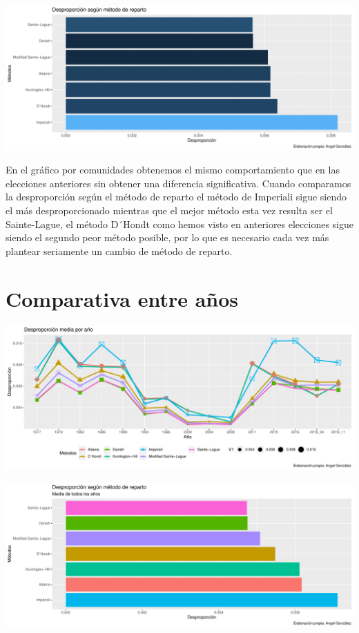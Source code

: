 \documentclass[12pt,a4paper,]{book}
\numberwithin{dummy}{section}
\theoremstyle{ocrenumbox}
\theoremstyle{blacknumex}
\theoremstyle{blacknumbox}
\theoremstyle{ocrenum}
\theoremstyle{ocrenum}
\begin{document}
\begin{center}\includegraphics[width=0.95\linewidth]{figurasR/unnamed-chunk-189-2} \end{center}

En el gráfico por comunidades obtenemos el mismo comportamiento que en
las elecciones anteriores sin obtener una diferencia significativa.
Cuando comparamos la desproporción según el método de reparto el método
de Imperiali sigue siendo el más desproporcionado mientras que el mejor
método esta vez resulta ser el Sainte-Lague, el método D´Hondt como
hemos visto en anteriores elecciones sigue siendo el segundo peor método
posible, por lo que es necesario cada vez más plantear seriamente un
cambio de método de reparto.

\hypertarget{comparativa-entre-auxf1os}{%
\section{Comparativa entre años}\label{comparativa-entre-auxf1os}}

\begin{center}\includegraphics[width=0.95\linewidth]{figurasR/unnamed-chunk-190-1} \end{center}

\begin{center}\includegraphics[width=0.95\linewidth]{figurasR/unnamed-chunk-190-2} \end{center}
\end{document}
